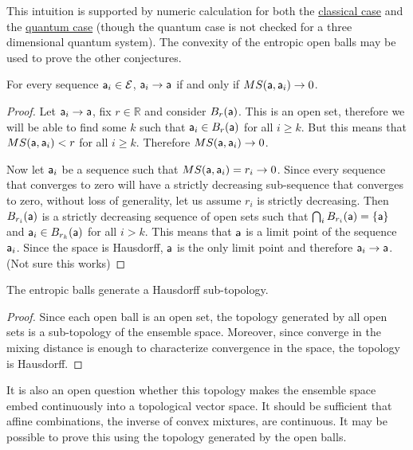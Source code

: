 \begin{remark}
	This intuition is supported by numeric calculation for both the \href{https://www.desmos.com/calculator/ama0u3u31d}{classical case} and the \href{https://www.desmos.com/calculator/6ga2hygwmm}{quantum case} (though the quantum case is not checked for a three dimensional quantum system). The convexity of the entropic open balls may be used to prove the other conjectures.
\end{remark}

\begin{conj}
	For every sequence $\ens[a]_i \in \Ens$, $\ens[a]_i \to \ens[a]$ if and only if $MS(\ens[a], \ens[a]_i) \to 0$.
\end{conj}

\begin{proof}
	Let $\ens[a]_i \to \ens[a]$, fix $r \in \mathbb{R}$ and consider $B_r(\ens[a])$. This is an open set, therefore we will be able to find some $k$ such that $\ens[a]_i \in B_r(\ens[a])$ for all $i \geq k$. But this means that $MS(\ens[a], \ens[a]_i) < r$ for all $i \geq k$. Therefore $MS(\ens[a], \ens[a]_i) \to 0$.
	
	Now let $\ens[a]_i$ be a sequence such that $MS(\ens[a], \ens[a]_i) = r_i \to 0$. Since every sequence that converges to zero will have a strictly decreasing sub-sequence that converges to zero, without loss of generality, let us assume $r_i$ is strictly decreasing. Then $B_{r_i}(\ens[a])$ is a strictly decreasing sequence of open sets such that $\bigcap_i B_{r_i}(\ens[a]) = \{\ens[a]\}$ and $\ens[a]_i \in B_{r_k}(\ens[a])$ for all $i>k$. This means that $\ens[a]$ is a limit point of the sequence $\ens[a]_i$. Since the space is Hausdorff, $\ens[a]$ is the only limit point and therefore $\ens[a]_i \to \ens[a]$. (Not sure this works)
\end{proof}

\begin{conj}
	The entropic balls generate a Hausdorff sub-topology.
\end{conj}

\begin{proof}
	Since each open ball is an open set, the topology generated by all open sets is a sub-topology of the ensemble space. Moreover, since converge in the mixing distance is enough to characterize convergence in the space, the topology is Hausdorff.
\end{proof}

It is also an open question whether this topology makes the ensemble space embed continuously into a topological vector space. It should be sufficient that affine combinations, the inverse of convex mixtures, are continuous. It may be possible to prove this using the topology generated by the open balls.

